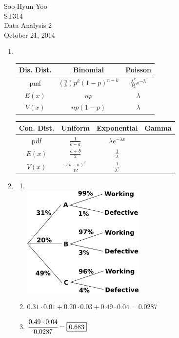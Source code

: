 \documentclass[12pt,letterpaper]{article}
\begin{document}
Soo-Hyun Yoo \\
ST314 \\
Data Analysis 2\\
October 21, 2014

\begin{enumerate}
	\item \hfill\\
		\begin{table}[!h]
			\centering
			\begin{tabular}{|c|c|c|} \hline
				Dis. Dist. & Binomial & Poisson \\ \hline\hline
				pmf & $\left(^n_k\right) p^k(1-p)^{n-k}$ & $\frac{\lambda^k}{k!}e^{-\lambda}$ \\ \hline
				$E(x)$ & $np$ & $\lambda$ \\ \hline
				$V(x)$ & $np(1-p)$ & $\lambda$ \\ \hline
			\end{tabular}
		\end{table}
		\begin{table}[!h]
			\centering
			\begin{tabular}{|c|c|c|c|} \hline
				Con. Dist. & Uniform & Exponential & Gamma \\ \hline\hline
				pdf & $\frac{1}{b-a}$ & $\lambda e^{-\lambda x}$ &  \\ \hline
				$E(x)$ & $\frac{a+b}{2}$ & $\frac{1}{\lambda}$ & \\ \hline
				$V(x)$ & $\frac{(b-a)^2}{12}$ & $\frac{1}{\lambda^2}$ & \\ \hline
			\end{tabular}
		\end{table}
	\item
		\begin{enumerate}
			\item \hfill\\ \includegraphics[width=0.5\textwidth]{2a.png}
			\item $0.31 \cdot 0.01 + 0.20 \cdot 0.03 + 0.49 \cdot 0.04 = \boxed{0.0287}$
			\item $\cfrac{0.49 \cdot 0.04}{0.0287} = \boxed{0.683}$
		\end{enumerate}


\end{enumerate}
\end{document}
